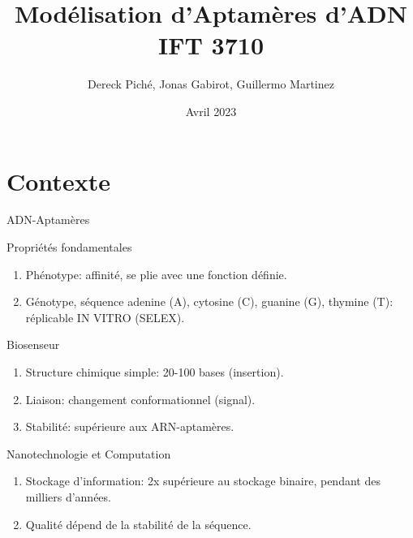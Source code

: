 \documentclass{beamer}
\title{Modélisation d'Aptamères d'ADN IFT 3710}
\author{Dereck Piché, Jonas Gabirot, Guillermo Martinez}
\institute{Université de Montréal}
\date{Avril 2023}
\begin{document}
\frame{\titlepage}

\section{Contexte}
\begin{frame}{ADN-Aptamères}
\begin{block}{Propriétés fondamentales}
\begin{enumerate}
    \item Phénotype: affinité, se plie avec une fonction définie.
    \item Génotype, séquence adenine (A), cytosine (C), guanine (G), thymine (T): réplicable IN VITRO (SELEX).
\end{enumerate}
\end{block}

\begin{block}{Biosenseur}
\begin{enumerate}
    \item Structure chimique simple: 20-100 bases (insertion).
    \item Liaison: changement conformationnel (signal).
    \item Stabilité: supérieure aux ARN-aptamères.
\end{enumerate}
\end{block}

\begin{block}{Nanotechnologie et Computation}
\begin{enumerate}
    \item Stockage d'information: 2x supérieure au stockage binaire, pendant des milliers d'années.
    \item Qualité dépend de la stabilité de la séquence.
\end{enumerate}
\end{block}

\end{frame}
\end{document}
